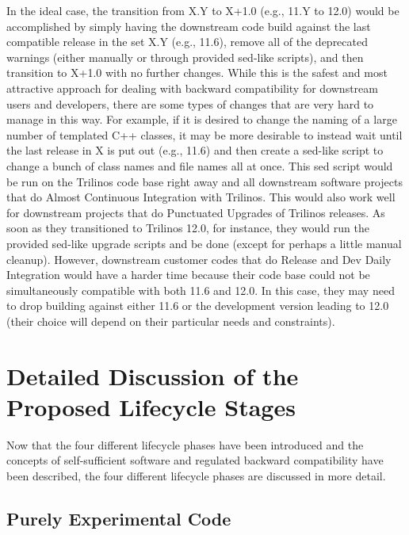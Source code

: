 \documentclass[11pt]{SANDreport}
\begin{document}
In the ideal case, the transition from X.Y to X+1.0 (e.g., 11.Y to
12.0) would be accomplished by simply having the downstream code build
against the last compatible release in the set X.Y (e.g., 11.6),
remove all of the deprecated warnings (either manually or through
provided sed-like scripts), and then transition to X+1.0 with no
further changes.  While this is the safest and most attractive approach
for dealing with backward compatibility for downstream users and
developers, there are some types of changes that are very hard to
manage in this way.  For example, if it is desired to change the
naming of a large number of templated C++ classes, it may be more
desirable to instead wait until the last release in X is put out
(e.g., 11.6) and then create a sed-like script to change a bunch of
class names and file names all at once.  This sed script would be run
on the Trilinos code base right away and all downstream software
projects that do Almost Continuous Integration
{}\cite{SoftwareIntegrationforCSE09} with Trilinos.  This would also
work well for downstream projects that do Punctuated Upgrades
{}\cite{SoftwareIntegrationforCSE09} of Trilinos releases.  As soon as
they transitioned to Trilinos 12.0, for instance, they would run the
provided sed-like upgrade scripts and be done (except for perhaps a
little manual cleanup).  However, downstream customer codes that do
Release and Dev Daily Integration {}\cite{SoftwareIntegrationforCSE09}
would have a harder time because their code base could not be
simultaneously compatible with both 11.6 and 12.0.  In this case, they
may need to drop building against either 11.6 or the development
version leading to 12.0 (their choice will depend on their particular
needs and constraints).


%
{}\section{Detailed Discussion of the Proposed Lifecycle Stages}
\label{sec:detained_lifecycle_stages}
%

Now that the four different lifecycle phases have been introduced and
the concepts of self-sufficient software and regulated backward
compatibility have been described, the four different lifecycle phases
are discussed in more detail.


%
{}\subsection{Purely Experimental Code}
\label{sec:purely_experimental_code}
%
\end{document}
